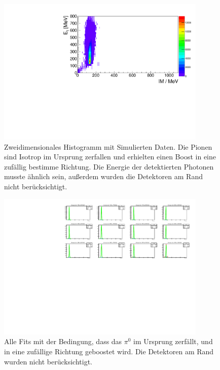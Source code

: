 \documentclass[a4paper,11pt,oneside,final,german,openbib,pdftex]{scrbook}
\begin{document}
{\begin{appendix}
\begin{figure}[h!]
	\begin{center}
		\includegraphics[width=100mm]{NewCalib/UrsprungIsotrop/20171904SimUrsprungIsotrop30DegreeCutHist}
		\caption[Simulation: 2D-Hist Isotroper Boost im Ursprung ohne Detektoren am Rand]{Zweidimensionales Histogramm mit Simulierten Daten. Die Pionen sind Isotrop im Ursprung zerfallen und erhielten einen Boost in eine zuf\"allig bestimme Richtung. Die Energie der detektierten Photonen musste \"ahnlich sein, au{\ss}erdem wurden die Detektoren am Rand nicht ber\"ucksichtigt.}
		\label{fig:Sim-Data-Ursprung-2DHist-30-Degree-Edge}
	\end{center}
\end{figure}

\begin{figure}[h!]
	\begin{center}
		\includegraphics[width=100mm]{NewCalib/UrsprungIsotrop/20171904SimIsotropUrsprung30DegreeCutAllFits}
		\caption[Simulation: 2D-Hist Isotroper Boost im Ursprung ohne Detektoren am Rand alle Fits]{Alle Fits mit der Bedingung, dass das $\pi^0$ im Ursprung zerf\"allt, und in eine zuf\"allige Richtung geboostet wird. Die Detektoren am Rand wurden nicht ber\"ucksichtigt.}
	\end{center}
	

\end{figure}
\end{appendix}}
\end{document}
